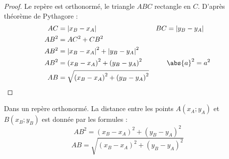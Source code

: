 \documentclass[main.tex]{subfiles}
\begin{document}
\begin{proof}
	Le repère est orthonormé, le triangle $ABC$ rectangle en $C$. D'après théorème de Pythagore :
	\textcolor{white}{
	\begin{align*}
		AC&=|x_{B}-x_{A}| & 
		BC&=|y_{B}-y_{A}|	\\
		AB^2&= AC^2 + CB^2 \\
		AB^2& = \left|x_{B}-x_{A}\right|^2+\left|y_{B}-y_{A}\right|^2\\
		AB^2& =\left(x_{B}-x_{A}\right)^2+\left(y_{B}-y_{A}\right)^2 &&\text{$\abs{a}^2=a^2$}\\
		AB & =\sqrt{\left(x_{B}-x_{A}\right)^2+\left(y_{B}-y_{A}\right)^2}
	\end{align*} 
}
\vfill
\end{proof} 
\begin{theorem} Dans un repère orthonormé. La distance entre les points $A(x_A;y_A)$ et $B(x_B;y_B)$ est donnée par les formules :
	\setlength{\abovedisplayskip}{3pt}
	\setlength{\belowdisplayskip}{3pt} 
	$$AB^2= \left(x_{B}-x_{A}\right)^2+\left(y_{B}-y_{A}\right)^2$$
	$$AB   =\sqrt{\left(x_{B}-x_{A}\right)^2+\left(y_{B}-y_{A}\right)^2}$$
\end{theorem}  






\newpage 
{}  
\pagestyle{scrheadings} %
\onehalfspacing
\end{document}
